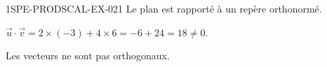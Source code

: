 \begin{corrige}{1SPE-PRODSCAL-EX-021}
Le plan est rapporté à un repère orthonormé.

$\vec{u} \cdot \vec{v} = 2 \times (-3) + 4 \times 6 = -6 + 24 = 18
\neq 0$.

Les vecteurs ne sont pas orthogonaux.
\end{corrige}
